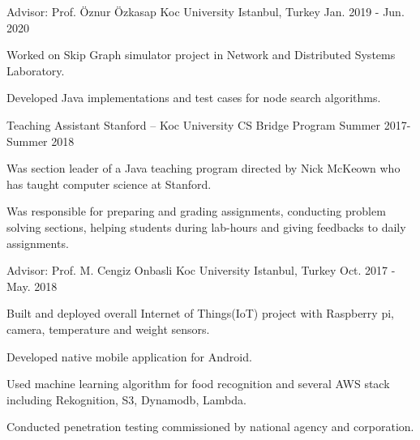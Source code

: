 \vspace{\acvSectionRemove}


\begin{cventries}
  \cventry
    {Advisor: Prof. Öznur Özkasap} %
    {Koc University} %
    {Istanbul, Turkey} %
    {Jan. 2019 - Jun. 2020} %
    {
      \begin{cvitems} %
        \item {Worked on Skip Graph simulator project in Network and Distributed Systems Laboratory.}
        \item {Developed Java implementations and test cases for node search algorithms.}
      \end{cvitems}
    }

  \cventry
    {Teaching Assistant } %
    {Stanford – Koc University CS Bridge Program} %
    {} %
    {Summer 2017-Summer 2018} %
    {
      \begin{cvitems} %
        \item {Was section leader of a Java teaching program directed by Nick McKeown who has taught computer science at Stanford.}
        \item {Was responsible for preparing and grading assignments, conducting problem solving sections, helping students during lab-hours and giving feedbacks to daily assignments.}
      \end{cvitems}
    }

  \cventry
    {Advisor: Prof. M. Cengiz Onbasli} %
    {Koc University} %
    {Istanbul, Turkey} %
    {Oct. 2017 - May. 2018} %
    {
      \begin{cvitems} %
        \item {Built and deployed overall Internet of Things(IoT) project with Raspberry pi, camera, temperature and weight sensors.  }
        \item {Developed native mobile application for Android. }
       	\item {Used machine learning algorithm for food recognition and several AWS stack including Rekognition, S3, Dynamodb, Lambda.} 
        \item {Conducted penetration testing commissioned by national agency and corporation.}
      \end{cvitems}
    }


\end{cventries}
